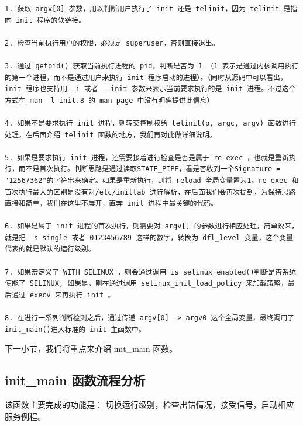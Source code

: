 {\begin{shaded}\begin{verbatim}
1. 获取 argv[0] 参数，用以判断用户执行了 init 还是 telinit，因为 telinit 是指向 init 程序的软链接。

2. 检查当前执行用户的权限，必须是 superuser，否则直接退出。

3. 通过 getpid() 获取当前执行进程的 pid，判断是否为 1 （1 表示是通过内核调用执行的第一个进程，而不是通过用户来执行 init 程序启动的进程）。（同时从源码中可以看出，init 程序也支持用 -i 或者 --init 参数来表示当前要求执行的是 init 进程。不过这个方式在 man -l init.8 的 man page 中没有明确提供此信息）

4. 如果不是要求执行 init 进程，则转交控制权给 telinit(p, argc, argv) 函数进行处理。在后面介绍 telinit 函数的地方，我们再对此做详细说明。

5. 如果是要求执行 init 进程，还需要接着进行检查是否是属于 re-exec ，也就是重新执行，而不是首次执行。判断思路是通过读取STATE_PIPE，看是否收到一个Signature = "12567362"的字符串来确定。如果是重新执行，则将 reload 全局变量置为1。re-exec 和首次执行最大的区别是没有对/etc/inittab 进行解析，在后面我们会再次提到，为保持思路直接和简单，我们在这里不展开，直奔 init 进程中最关键的代码。

6. 如果是属于 init 进程的首次执行，则需要对 argv[] 的参数进行相应处理，简单说来，就是把 -s single 或者 0123456789 这样的数字，转换为 dfl_level 变量，这个变量代表的就是默认的运行级别。

7. 如果宏定义了 WITH_SELINUX ，则会通过调用 is_selinux_enabled()判断是否系统使能了 SELINUX, 如果是，则在通过调用 selinux_init_load_policy 来加载策略，最后通过 execv 来再执行 init 。

8. 在进行一系列判断检测之后，通过传递 argv[0] -> argv0 这个全局变量，最终调用了 init_main()进入标准的 init 主函数中。
\end{verbatim}\end{shaded}}
下一小节，我们将重点来介绍 init\_main 函数。

\subsection{init\_main 函数流程分析}

该函数主要完成的功能是：
切换运行级别，检查出错情况，接受信号，启动相应服务例程。

